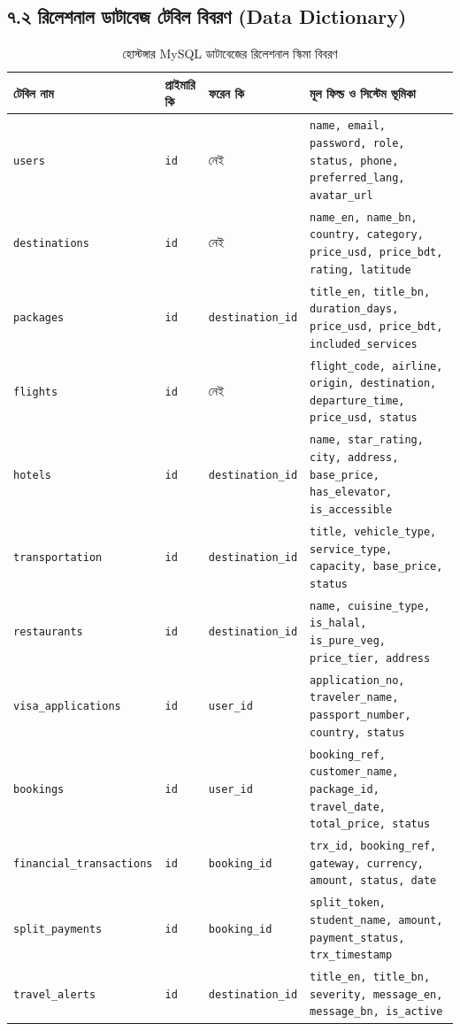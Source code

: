 \documentclass[11pt,a4paper]{article}
\begin{document}
\subsection{৭.২ রিলেশনাল ডাটাবেজ টেবিল বিবরণ (Data Dictionary)}
\begin{table}[H]
\centering
\scriptsize
\begin{tabularx}{\textwidth}{l l l X}
\toprule
\textbf{টেবিল নাম} & \textbf{প্রাইমারি কি} & \textbf{ফরেন কি} & \textbf{মূল ফিল্ড ও সিস্টেম ভূমিকা} \\
\midrule
\texttt{users} & \texttt{id} & নেই & \texttt{name, email, password, role, status, phone, preferred\_lang, avatar\_url} \\
\addlinespace
\texttt{destinations} & \texttt{id} & নেই & \texttt{name\_en, name\_bn, country, category, price\_usd, price\_bdt, rating, latitude} \\
\addlinespace
\texttt{packages} & \texttt{id} & \texttt{destination\_id} & \texttt{title\_en, title\_bn, duration\_days, price\_usd, price\_bdt, included\_services} \\
\addlinespace
\texttt{flights} & \texttt{id} & নেই & \texttt{flight\_code, airline, origin, destination, departure\_time, price\_usd, status} \\
\addlinespace
\texttt{hotels} & \texttt{id} & \texttt{destination\_id} & \texttt{name, star\_rating, city, address, base\_price, has\_elevator, is\_accessible} \\
\addlinespace
\texttt{transportation}& \texttt{id} & \texttt{destination\_id} & \texttt{title, vehicle\_type, service\_type, capacity, base\_price, status} \\
\addlinespace
\texttt{restaurants} & \texttt{id} & \texttt{destination\_id} & \texttt{name, cuisine\_type, is\_halal, is\_pure\_veg, price\_tier, address} \\
\addlinespace
\texttt{visa\_applications} & \texttt{id} & \texttt{user\_id} & \texttt{application\_no, traveler\_name, passport\_number, country, status} \\
\addlinespace
\texttt{bookings} & \texttt{id} & \texttt{user\_id} & \texttt{booking\_ref, customer\_name, package\_id, travel\_date, total\_price, status} \\
\addlinespace
\texttt{financial\_transactions} & \texttt{id} & \texttt{booking\_id} & \texttt{trx\_id, booking\_ref, gateway, currency, amount, status, date} \\
\addlinespace
\texttt{split\_payments} & \texttt{id} & \texttt{booking\_id} & \texttt{split\_token, student\_name, amount, payment\_status, trx\_timestamp} \\
\addlinespace
\texttt{travel\_alerts} & \texttt{id} & \texttt{destination\_id} & \texttt{title\_en, title\_bn, severity, message\_en, message\_bn, is\_active} \\
\bottomrule
\end{tabularx}
\caption{হোস্টঙ্গার MySQL ডাটাবেজের রিলেশনাল স্কিমা বিবরণ}
\end{table}
\end{document}
